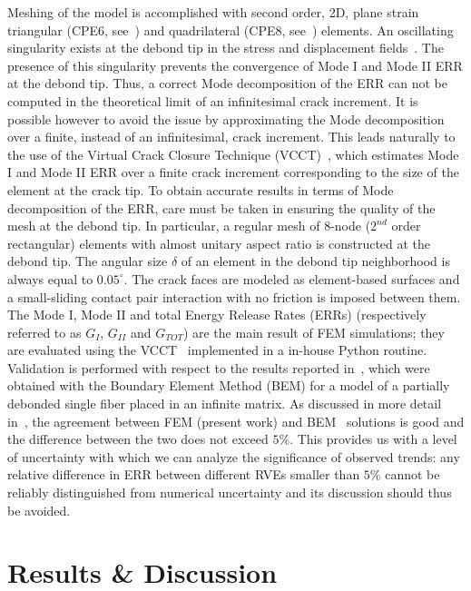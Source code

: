 \documentclass[smallextended]{svjour3}       %
\begin{document}
Meshing of the model is accomplished with second order, 2D, plane strain triangular (CPE6, see~\cite{abq12}) and quadrilateral (CPE8, see~\cite{abq12}) elements. An oscillating singularity exists at the debond tip in the stress and displacement fields~\cite{England1971,Toya1974,Comninou1977}. The presence of this singularity prevents the convergence of Mode I and Mode II ERR at the debond tip. Thus, a correct Mode decomposition of the ERR can not be computed in the theoretical limit of an infinitesimal crack increment. It is possible however to avoid the issue by approximating the Mode decomposition over a finite, instead of an infinitesimal, crack increment. This leads naturally to the use of the Virtual Crack Closure Technique (VCCT)~\cite{Krueger2004}, which estimates Mode I and Mode II ERR over a finite crack increment corresponding to the size of the element at the crack tip. To obtain accurate results in terms of Mode decomposition of the ERR, care must be taken in ensuring the quality of the mesh at the debond tip. In particular, a regular mesh of 8-node ($2^{nd}$ order rectangular) elements with almost unitary aspect ratio is constructed at the debond tip. The angular size $\delta$ of an element in the debond tip neighborhood is always equal to $0.05^{\circ}$. The crack faces are modeled as element-based surfaces and a small-sliding contact pair interaction with no friction is imposed between them. The Mode I, Mode II and total Energy Release Rates (ERRs) (respectively referred to as $G_{I}$, $G_{II}$ and $G_{TOT}$) are the main result of FEM simulations; they are evaluated using the VCCT~\cite{Krueger2004} implemented in a in-house Python routine. Validation is performed with respect to the results reported in~\cite{Paris2007,Sandino2016}, which were obtained with the Boundary Element Method (BEM) for a model of a partially debonded single fiber placed in an infinite matrix. As discussed in more detail in~\cite{DiStasio2019}, the agreement between FEM (present work) and BEM~\cite{Paris2007,Sandino2016} solutions is good and the difference between the two does not exceed $5\%$. This provides us with a level of uncertainty with which we can analyze the significance of observed trends: any relative difference in ERR between different RVEs smaller than $5\%$ cannot be reliably distinguished from numerical uncertainty and its discussion should thus be avoided.

\section{Results \& Discussion}\label{sec:results}
\end{document}
